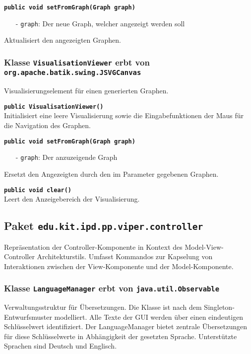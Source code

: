 \documentclass[parskip=full,11pt,twoside]{scrartcl}
\begin{document}
\textbf{\texttt{public void setFromGraph(Graph graph)}}
\begin{itemize}[noitemsep]
	\item[-] \texttt{graph}: Der neue Graph, welcher angezeigt werden soll
\end{itemize}
Aktualisiert den angezeigten Graphen.

\subsubsection{Klasse \texttt{VisualisationViewer} erbt von \texttt{org.apache.batik.swing.JSVGCanvas}}

Visualisierungselement für einen generierten Graphen.

\textbf{\texttt{public VisualisationViewer()}}\\
Initialisiert eine leere Visualisierung sowie die Eingabefunktionen der Maus für die Navigation des Graphen.

\textbf{\texttt{public void setFromGraph(Graph graph)}}
\begin{itemize}[noitemsep]
	\item[-] \texttt{graph}: Der anzuzeigende Graph
\end{itemize}
Ersetzt den Angezeigten durch den im Parameter gegebenen Graphen.

\textbf{\texttt{public void clear()}}\\
Leert den Anzeigebereich der Visualisierung.

\newpage
\subsection{Paket \texttt{edu.kit.ipd.pp.viper.controller}}

Repräsentation der Controller-Komponente in Kontext des Model-View-Controller Architekturstils. Umfasst Kommandos zur Kapselung von Interaktionen zwischen der View-Komponente und der Model-Komponente.

\subsubsection{Klasse \texttt{LanguageManager} erbt von \texttt{java.util.Observable}}

Verwaltungsstruktur für Übersetzungen. Die Klasse ist nach dem Singleton-Entwurfsmuster modelliert. Alle Texte der GUI werden über einen eindeutigen Schlüsselwert identifiziert. Der LanguageManager bietet zentrale Übersetzungen für diese Schlüsselwerte in Abhängigkeit der gesetzten Sprache. Unterstützte Sprachen sind Deutsch und Englisch.
\end{document}

